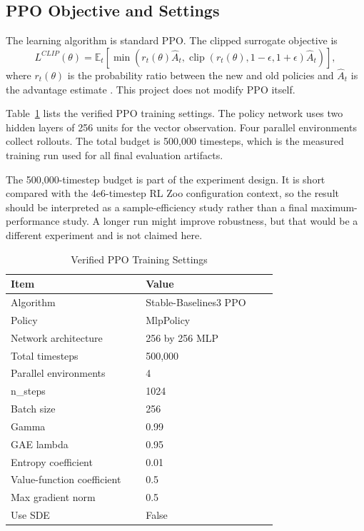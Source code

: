 \documentclass[conference]{IEEEtran}
\begin{document}
\subsection{PPO Objective and Settings}

The learning algorithm is standard PPO. The clipped surrogate objective is
\begin{equation}
L^{CLIP}(\theta)=
\mathbb{E}_t\left[
\min\left(r_t(\theta)\hat A_t,
\operatorname{clip}(r_t(\theta),1-\epsilon,1+\epsilon)\hat A_t\right)
\right],
\end{equation}
where $r_t(\theta)$ is the probability ratio between the new and old policies and $\hat A_t$ is the advantage estimate \cite{ref2}. This project does not modify PPO itself.

Table~\ref{tab:ppo} lists the verified PPO training settings. The policy network uses two hidden layers of 256 units for the vector observation. Four parallel environments collect rollouts. The total budget is 500,000 timesteps, which is the measured training run used for all final evaluation artifacts.

The 500,000-timestep budget is part of the experiment design. It is short compared with the 4e6-timestep RL Zoo configuration context, so the result should be interpreted as a sample-efficiency study rather than a final maximum-performance study. A longer run might improve robustness, but that would be a different experiment and is not claimed here.

\begin{table}[t]
\caption{Verified PPO Training Settings}
\label{tab:ppo}
\centering
\scriptsize
\begin{tabular}{p{0.45\linewidth}p{0.44\linewidth}}
\toprule
Item & Value \\
\midrule
Algorithm & Stable-Baselines3 PPO \\
Policy & MlpPolicy \\
Network architecture & 256 by 256 MLP \\
Total timesteps & 500,000 \\
Parallel environments & 4 \\
n\_steps & 1024 \\
Batch size & 256 \\
Gamma & 0.99 \\
GAE lambda & 0.95 \\
Entropy coefficient & 0.01 \\
Value-function coefficient & 0.5 \\
Max gradient norm & 0.5 \\
Use SDE & False \\
\bottomrule
\end{tabular}
\end{table}
\end{document}

